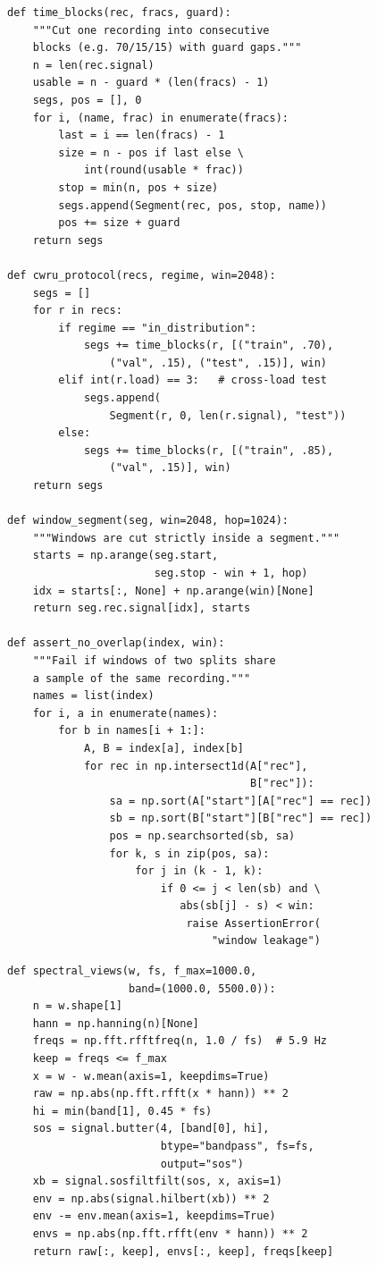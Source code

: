 \documentclass[conference]{IEEEtran}
\begin{document}
\begin{lstlisting}[caption={Split before windowing and leakage check.},label={lst:split}]
def time_blocks(rec, fracs, guard):
    """Cut one recording into consecutive
    blocks (e.g. 70/15/15) with guard gaps."""
    n = len(rec.signal)
    usable = n - guard * (len(fracs) - 1)
    segs, pos = [], 0
    for i, (name, frac) in enumerate(fracs):
        last = i == len(fracs) - 1
        size = n - pos if last else \
            int(round(usable * frac))
        stop = min(n, pos + size)
        segs.append(Segment(rec, pos, stop, name))
        pos += size + guard
    return segs

def cwru_protocol(recs, regime, win=2048):
    segs = []
    for r in recs:
        if regime == "in_distribution":
            segs += time_blocks(r, [("train", .70),
                ("val", .15), ("test", .15)], win)
        elif int(r.load) == 3:   # cross-load test
            segs.append(
                Segment(r, 0, len(r.signal), "test"))
        else:
            segs += time_blocks(r, [("train", .85),
                ("val", .15)], win)
    return segs

def window_segment(seg, win=2048, hop=1024):
    """Windows are cut strictly inside a segment."""
    starts = np.arange(seg.start,
                       seg.stop - win + 1, hop)
    idx = starts[:, None] + np.arange(win)[None]
    return seg.rec.signal[idx], starts

def assert_no_overlap(index, win):
    """Fail if windows of two splits share
    a sample of the same recording."""
    names = list(index)
    for i, a in enumerate(names):
        for b in names[i + 1:]:
            A, B = index[a], index[b]
            for rec in np.intersect1d(A["rec"],
                                      B["rec"]):
                sa = np.sort(A["start"][A["rec"] == rec])
                sb = np.sort(B["start"][B["rec"] == rec])
                pos = np.searchsorted(sb, sa)
                for k, s in zip(pos, sa):
                    for j in (k - 1, k):
                        if 0 <= j < len(sb) and \
                           abs(sb[j] - s) < win:
                            raise AssertionError(
                                "window leakage")
\end{lstlisting}

\begin{lstlisting}[caption={High-resolution raw and squared-envelope spectra.},label={lst:spec}]
def spectral_views(w, fs, f_max=1000.0,
                   band=(1000.0, 5500.0)):
    n = w.shape[1]
    hann = np.hanning(n)[None]
    freqs = np.fft.rfftfreq(n, 1.0 / fs)  # 5.9 Hz
    keep = freqs <= f_max
    x = w - w.mean(axis=1, keepdims=True)
    raw = np.abs(np.fft.rfft(x * hann)) ** 2
    hi = min(band[1], 0.45 * fs)
    sos = signal.butter(4, [band[0], hi],
                        btype="bandpass", fs=fs,
                        output="sos")
    xb = signal.sosfiltfilt(sos, x, axis=1)
    env = np.abs(signal.hilbert(xb)) ** 2
    env -= env.mean(axis=1, keepdims=True)
    envs = np.abs(np.fft.rfft(env * hann)) ** 2
    return raw[:, keep], envs[:, keep], freqs[keep]
\end{lstlisting}
\end{document}
